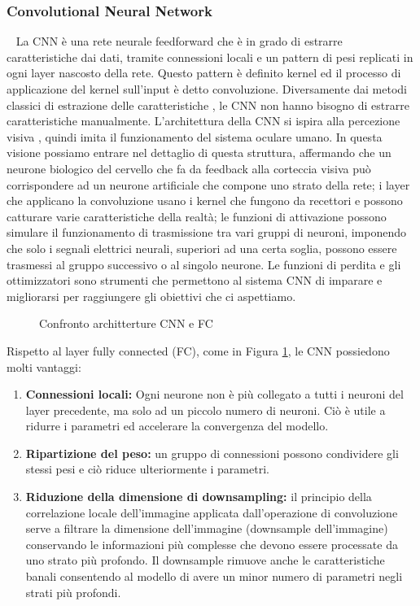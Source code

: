 \subsubsection{Convolutional Neural Network}~\newline
\label{subsubsec:3.4.1}
La CNN è una rete neurale feedforward che è in grado di estrarre caratteristiche dai dati, tramite connessioni locali e 
un pattern di pesi replicati in ogni layer nascosto della rete. Questo pattern è definito kernel ed il processo di 
applicazione del kernel sull'input è detto convoluzione. 
Diversamente dai metodi classici di estrazione delle caratteristiche \cite{1717463, lindeberg2012scale}, le CNN non 
hanno bisogno di estrarre caratteristiche manualmente. L'architettura della CNN si ispira alla percezione visiva
\cite{hubel1962receptive}, quindi imita il funzionamento del sistema oculare umano. In questa visione possiamo 
entrare nel dettaglio di questa struttura, affermando che un neurone biologico del cervello che fa da feedback 
alla corteccia visiva può corrispondere ad un neurone artificiale che compone uno strato della rete; i layer che
applicano la convoluzione usano i kernel che fungono da recettori e possono catturare varie caratteristiche della
realtà; le funzioni di attivazione possono simulare il funzionamento di trasmissione tra vari gruppi di neuroni,
imponendo che solo i segnali elettrici neurali, superiori ad una certa soglia, possono essere trasmessi al gruppo
successivo o al singolo neurone. Le funzioni di perdita e gli ottimizzatori sono strumenti che permettono al
sistema CNN di imparare e migliorarsi per raggiungere gli obiettivi che ci aspettiamo. 
\begin{figure}[hbpt!]
		\centering
  		\caption{Confronto architterture CNN e FC \cite{9451544}}
        \label{fig:cnnvsfc}
\end{figure}
Rispetto al layer fully connected (FC), come in Figura \ref{fig:cnnvsfc}, le CNN possiedono molti vantaggi:
\begin{enumerate}
    \item \textbf{Connessioni locali:} Ogni neurone non è più collegato a tutti i neuroni del layer precedente, 
          ma solo ad un piccolo numero di neuroni. Ciò è utile a ridurre i parametri ed accelerare la 
          convergenza del modello. 
    \item \textbf{Ripartizione del peso:} un gruppo di connessioni possono condividere gli stessi pesi e ciò riduce
          ulteriormente i parametri.
    \item \textbf{Riduzione della dimensione di downsampling:} il principio della correlazione locale dell'immagine
          applicata dall'operazione di convoluzione serve a filtrare la dimensione dell'immagine (downsample
          dell'immagine) conservando le informazioni più complesse che devono essere processate da uno strato 
          più profondo. Il downsample rimuove anche le caratteristiche banali consentendo al modello di
          avere un minor numero di parametri negli strati più profondi. 
\end{enumerate}
